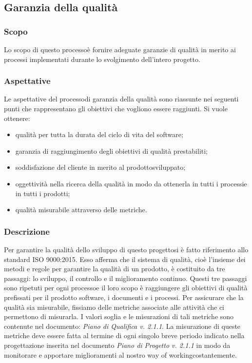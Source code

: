 \subsection{Garanzia della qualità}
\subsubsection{Scopo}
Lo scopo di questo processo\glosp è fornire adeguate garanzie di qualità in merito ai processi implementati durante lo svolgimento dell'intero progetto.
\subsubsection{Aspettative}
Le aspettative del processo\glo di garanzia della qualità sono riassunte nei seguenti punti che rappresentano gli obiettivi che vogliono essere raggiunti. Si vuole ottenere:
\begin{itemize}
	\item qualità per tutta la durata del ciclo di vita del software;
	\item garanzia di raggiungimento degli obiettivi di qualità prestabiliti;
	\item soddisfazione del cliente in merito al prodotto\glosp sviluppato;
	\item oggettività nella ricerca della qualità in modo da ottenerla in tutti i processi\glosp e in tutti i prodotti\glo;
	\item qualità misurabile attraverso delle metriche.
\end{itemize}
\subsubsection{Descrizione}
Per garantire la qualità dello sviluppo di questo progetto\glosp si è fatto riferimento allo standard ISO 9000:2015. Esso afferma che il sistema di qualità, cioè l'insieme dei metodi e regole per garantire la qualità di un prodotto\glo, è costituito da tre passaggi: lo sviluppo, il controllo e il miglioramento continuo. Questi tre passaggi sono ripetuti per ogni processo\glosp e il loro scopo è raggiungere gli obiettivi di qualità prefissati per il prodotto software, i documenti e i processi.
Per assicurare che la qualità sia misurabile, fissiamo delle metriche associate alle attività che ci permettono di misurarla. I valori soglia e le misurazioni di tali metriche sono contenute nel documento: \textit{Piano di Qualifica v. 2.1.1}.
La misurazione di queste metriche deve essere fatta al termine di ogni singolo breve periodo indicato nella progettazione inserita nel documento \textit{Piano di Progetto v. 2.1.1} in modo da monitorare e apportare miglioramenti al nostro way of working\glosp costantemente.
